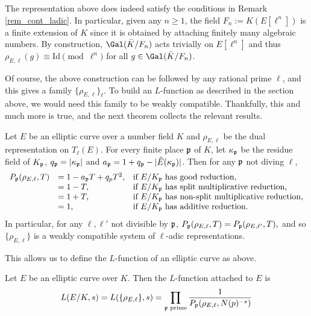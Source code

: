 \begin{rem}
    The representation above does indeed satisfy the conditions in Remark \ref{rem_cont_ladic}. In particular, given any $n\geq 1$, the field $F_n:=K(E[\ell^n])$ is a finite extension of $K$ since it is obtained by attaching finitely many algebraic numbers. By construction, $\Gal(\bar{K}/F_n)$ acts trivially on $E[\ell^n]$ and thus $\rho_{E,\ell}(g)\equiv \mathrm{Id}\pmod{\ell^n}$ for all $g\in\Gal(\bar{K}/F_n)$.
\end{rem}

Of course, the above construction can be followed by any rational prime $\ell$, and this gives a family $\{\rho_{E,\ell}\}_\ell$. To build an $L$-function as described in the section above, we would need this family to be weakly compatible. Thankfully, this and much more is true, and the next theorem collects the relevant results.

\begin{thm}
    Let $E$ be an elliptic curve over a number field $K$ and $\rho_{E,\ell}$ be the dual representation on $T_\ell(E)$. For every finite place $\mathfrak{p}$ of $K$, let $\kappa_{\mathfrak{p}}$ be the residue field of $K_{\mathfrak{p}}$, $q_{\mathfrak{p}}=|\kappa_{\mathfrak{p}}|$ and $a_{\mathfrak{p}}=1+q_{\mathfrak{p}}-|\tilde{E}(\kappa_{\mathfrak{p}})|$. Then for any $\mathfrak{p}$ not diving $\ell$,
    \[
        \begin{array}{l l l}
            P_{\mathfrak{p}}(\rho_{E,\ell},T)&= 1-a_{\mathfrak{p}} T+q_p T^2, & \text{if } E/K_{\mathfrak{p}} \text{ has good reduction,}\\
            & = 1-T, & \text{if } E/K_{\mathfrak{p}} \text{ has split multiplicative reduction,}\\
            & = 1+T, & \text{if } E/K_{\mathfrak{p}} \text{ has non-split multiplicative reduction,}\\
            & = 1, & \text{if } E/K_{\mathfrak{p}} \text{ has additive reduction.}
        \end{array}
    \]
    In particular, for any $\ell,\ell'$ not divisible by $\mathfrak{p}$, 
    $P_{\mathfrak{p}}(\rho_{E,\ell},T)=P_{\mathfrak{p}}(\rho_{E,\ell'},T),$
    and so $\{\rho_{E,\ell}\}$ is a weakly compatible system of $\ell$-adic representations.
\end{thm}

This allows us to define the $L$-function of an elliptic curve as above.

\begin{defn}
    Let $E$ be an elliptic curve over $K$. Then the $L$-function attached to $E$ is 
    $$L(E/K,s)=L(\{\rho_{E,\ell}\},s)=\prod_{\mathfrak{p}\text{ prime}}\frac{1}{P_{\mathfrak{p}}(\rho_{E,\ell},N(p)^{-s})}$$
\end{defn}
